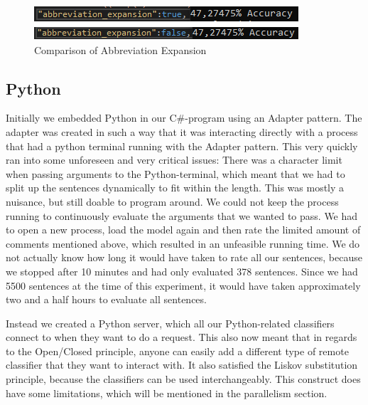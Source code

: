 \begin{figure}[H]
	\includegraphics[width=\textwidth]{Images/AbbreviationCompare}
	\centering
	\caption{Comparison of Abbreviation Expansion}
	\label{abbrevexpand}
\end{figure}

\subsection{Python} \label{Python}
Initially we embedded Python in our C\#-program using an Adapter pattern. The adapter was created in such a way that it was interacting directly with a process that had a python terminal running with the Adapter pattern. \cite{adapter}
This very quickly ran into some unforeseen and very critical issues:
There was a character limit when passing arguments to the Python-terminal, which meant that we had to split up the sentences dynamically to fit within the length. This was mostly a nuisance, but still doable to program around. 
We could not keep the process running to continuously evaluate the arguments that we wanted to pass. We had to open a new process, load the model again and then rate the limited amount of comments mentioned above, which resulted in an unfeasible running time. We do not actually know how long it would have taken to rate all our sentences, because we stopped after 10 minutes and had only evaluated 378 sentences. Since we had 5500 sentences at the time of this experiment, it would have taken approximately two and a half hours to evaluate all sentences. 

Instead we created a Python server, which all our Python-related classifiers connect to when they want to do a request. This also now meant that in regards to the Open/Closed principle, anyone can easily add a different type of remote classifier that they want to interact with. It also satisfied the Liskov substitution principle, because the classifiers can be used interchangeably. This construct does have some limitations, which will be mentioned in the parallelism section.

